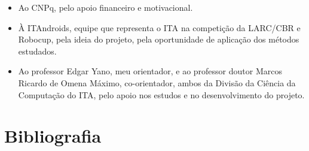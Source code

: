 \documentclass[a4paper,12pt]{article}
\begin{document}
\begin{itemize}
\item Ao CNPq, pelo apoio financeiro e motivacional.
\item À ITAndroids, equipe que representa o ITA na competição da LARC/CBR e Robocup, pela ideia do projeto, pela oportunidade de aplicação dos métodos estudados.
\item Ao professor Edgar Yano, meu orientador, e ao professor doutor Marcos Ricardo de Omena Máximo, co-orientador, ambos da Divisão da Ciência da Computação do ITA, pelo apoio nos estudos e no desenvolvimento do projeto.

\end{itemize}

\section{Bibliografia}

\printbibliography
\end{document}
